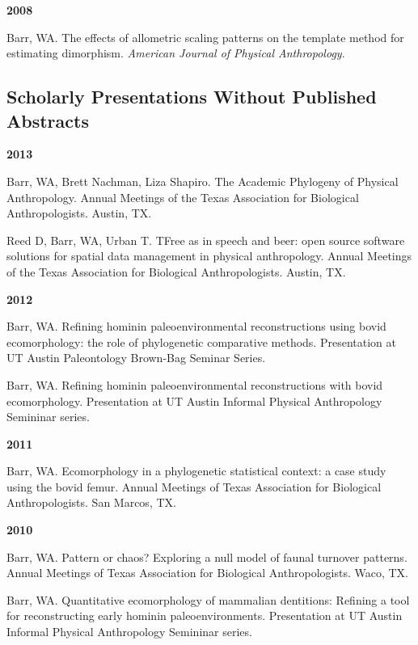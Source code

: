\documentclass{article}
\begin{document}
\begin{description*}
\item[] {\bfseries 2008}
\item[] Barr, WA. The effects of allometric scaling patterns on the template method for estimating dimorphism. \emph{American Journal of Physical Anthropology}.
\end{description*}
\subsection*{Scholarly Presentations Without Published Abstracts}

\begin{description*}
\item[] {\bfseries 2013}
\item[] Barr, WA, Brett Nachman, Liza Shapiro. The Academic Phylogeny of Physical Anthropology. Annual Meetings of the Texas Association for Biological Anthropologists. Austin, TX.

\item[] Reed D, Barr, WA, Urban T. TFree as in speech and beer: open source software solutions for spatial data management in physical anthropology. Annual Meetings of the Texas Association for Biological Anthropologists. Austin, TX.
\end{description*}
\begin{description*}
\item[] {\bfseries 2012}
\item[] Barr, WA. Refining hominin paleoenvironmental reconstructions using bovid ecomorphology: the role of phylogenetic comparative methods. Presentation at UT Austin Paleontology Brown-Bag Seminar Series.

\item[] Barr, WA. Refining hominin paleoenvironmental reconstructions with bovid ecomorphology. Presentation at UT Austin Informal Physical Anthropology Semininar series.
\end{description*}
\begin{description*}
\item[] {\bfseries 2011}
\item[] Barr, WA. Ecomorphology in a phylogenetic statistical context: a case study using the bovid femur. Annual Meetings of Texas Association for Biological Anthropologists. San Marcos, TX.
\end{description*}
\begin{description*}
\item[] {\bfseries 2010}
\item[] Barr, WA. Pattern or chaos? Exploring a null model of faunal turnover patterns. Annual Meetings of Texas Association for Biological Anthropologists. Waco, TX.

\item[] Barr, WA. Quantitative ecomorphology of mammalian dentitions: Refining a tool for reconstructing early hominin paleoenvironments. Presentation at UT Austin Informal Physical Anthropology Semininar series.
\end{description*}
\end{document}
